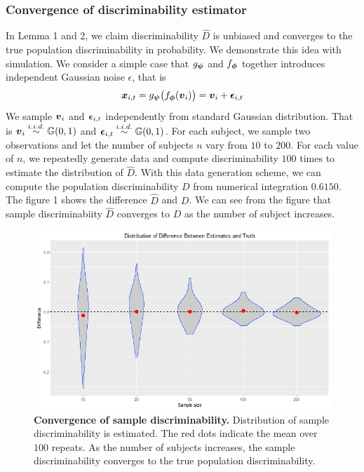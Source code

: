 \documentclass{article}
\begin{document}
\subsubsection{Convergence of discriminability estimator}
In Lemma 1 and 2, we claim discriminability $\hat{D}$ is unbiased and converges to  the true population discriminability in probability. We demonstrate this idea with simulation. We consider a simple case that $g_{\boldsymbol{\psi}}$ and $f_{\boldsymbol{\phi}}$ together introduces independent Gaussian noise $\epsilon$, that is
\begin{equation}
\boldsymbol{x}_{i,t} =g_{\boldsymbol{\psi}} \big(f_{\boldsymbol{\phi}} (\boldsymbol{v}_i) \big) =\boldsymbol{v}_{i} + \boldsymbol{\epsilon}_{i,t}
\end{equation}  
We sample $\boldsymbol{v}_{i}$ and $\boldsymbol{\epsilon}_{i,t}$ independently from standard Gaussian distribution. That is $\boldsymbol{v}_i \overset{i.i.d.}{\sim} \mathbb{G}(0,1)$ and $\boldsymbol{\epsilon}_{i,t} \overset{i.i.d.}{\sim} \mathbb{G}(0,1)$. For each  subject, we sample two observations and let the number of subjects $n$ vary from $10$ to $200$. For each value of $n$, we repeatedly generate data and compute discriminability $100$ times to estimate the distribution of $\hat{D}$. With this data generation scheme, we can compute the population discriminability $D$ from numerical integration $0.6150$. The figure 1 shows the difference $\hat{D}$ and $D$. We can see from the figure that sample discriminabiity $\hat{D}$ converges to $D$ as the number of subject increases.
\begin{figure}[ht!]
	\includegraphics[width=\linewidth]{../Figs/rel_conv.png}
	\caption{{\bf Convergence of sample discriminability.} Distribution of sample discriminability is estimated. The red dots indicate the mean over $100$ repeats. As the number of subjects increases, the sample discriminability converges to the true population discriminability. }
	\label{fig:1}
\end{figure}
\end{document}
